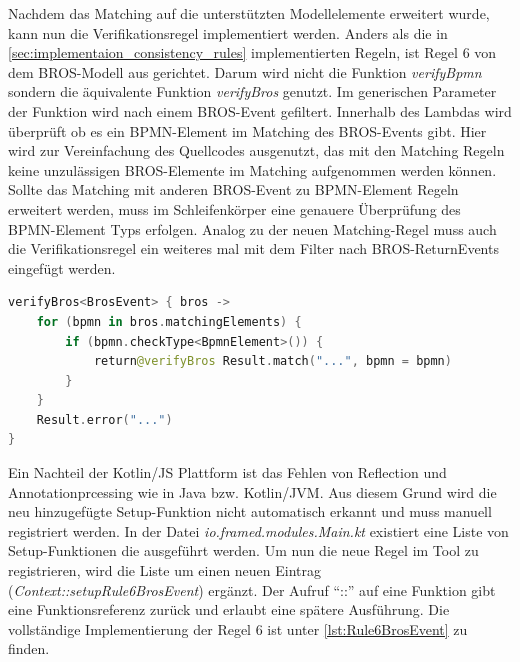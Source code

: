 Nachdem das Matching auf die unterstützten Modellelemente erweitert wurde, kann nun die Verifikationsregel implementiert werden.
Anders als die in \cref{sec:implementaion_consistency_rules} implementierten Regeln, ist Regel 6 von dem BROS-Modell aus gerichtet.
Darum wird nicht die Funktion \emph{verifyBpmn} sondern die äquivalente Funktion \emph{verifyBros} genutzt.
Im generischen Parameter der Funktion wird nach einem BROS-Event gefiltert.
Innerhalb des Lambdas wird überprüft ob es ein BPMN-Element im Matching des BROS-Events gibt.
Hier wird zur Vereinfachung des Quellcodes ausgenutzt, das mit den Matching Regeln keine unzulässigen BROS-Elemente im Matching aufgenommen werden können.
Sollte das Matching mit anderen BROS-Event zu BPMN-Element Regeln erweitert werden, muss im Schleifenkörper eine genauere Überprüfung des BPMN-Element Typs erfolgen.
Analog zu der neuen Matching-Regel muss auch die Verifikationsregel ein weiteres mal mit dem Filter nach BROS-ReturnEvents eingefügt werden.

\begin{lstlisting}[language=Kotlin, caption=Implementierung von Regel 6, label=lst:implementation_rule_6]
verifyBros<BrosEvent> { bros ->
    for (bpmn in bros.matchingElements) {
        if (bpmn.checkType<BpmnElement>()) {
            return@verifyBros Result.match("...", bpmn = bpmn)
        }
    }
    Result.error("...")
}
\end{lstlisting}

Ein Nachteil der Kotlin/JS Plattform ist das Fehlen von Reflection und Annotationprcessing wie in Java bzw. Kotlin/JVM.
Aus diesem Grund wird die neu hinzugefügte Setup-Funktion nicht automatisch erkannt und muss manuell registriert werden.
In der Datei \emph{io.framed.modules.Main.kt} existiert eine Liste von Setup-Funktionen die ausgeführt werden.
Um nun die neue Regel im Tool zu registrieren, wird die Liste um einen neuen Eintrag (\emph{Context::setupRule6BrosEvent}) ergänzt.
Der Aufruf ``::'' auf eine Funktion gibt eine Funktionsreferenz zurück und erlaubt eine spätere Ausführung.
Die vollständige Implementierung der Regel 6 ist unter \cref{lst:Rule6BrosEvent} zu finden.
